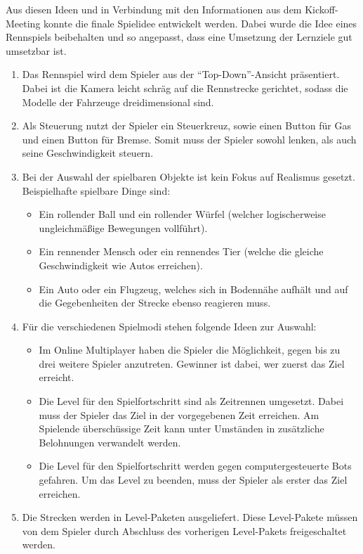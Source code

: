 	Aus diesen Ideen und in Verbindung mit den Informationen aus dem Kickoff-Meeting konnte die finale Spielidee entwickelt werden. Dabei wurde die Idee eines Rennspiels beibehalten und so angepasst, dass eine Umsetzung der Lernziele gut umsetzbar ist.
	\begin{enumerate}
		\item{Das Rennspiel wird dem Spieler aus der \enquote{Top-Down}-Ansicht präsentiert. Dabei ist die Kamera leicht schräg auf die Rennstrecke gerichtet, sodass die Modelle der Fahrzeuge dreidimensional sind.}
		\item{Als Steuerung nutzt der Spieler ein Steuerkreuz, sowie einen Button für Gas und einen Button für Bremse. Somit muss der Spieler sowohl lenken, als auch seine Geschwindigkeit steuern.}
		\item{Bei der Auswahl der spielbaren Objekte ist kein Fokus auf Realismus gesetzt. Beispielhafte spielbare Dinge sind:}
		\begin{itemize}
			\item{Ein rollender Ball und ein rollender Würfel (welcher logischerweise ungleichmäßige Bewegungen vollführt).}
			\item{Ein rennender Mensch oder ein rennendes Tier (welche die gleiche Geschwindigkeit wie Autos erreichen).}
			\item{Ein Auto oder ein Flugzeug, welches sich in Bodennähe aufhält und auf die Gegebenheiten der Strecke ebenso reagieren muss.}
		\end{itemize}
		\item{Für die verschiedenen Spielmodi stehen folgende Ideen zur Auswahl:}
		\begin{itemize}
			\item{Im Online Multiplayer haben die Spieler die Möglichkeit, gegen bis zu drei weitere Spieler anzutreten. Gewinner ist dabei, wer zuerst das Ziel erreicht.}
			\item{Die Level für den Spielfortschritt sind als Zeitrennen umgesetzt. Dabei muss der Spieler das Ziel in der vorgegebenen Zeit erreichen. Am Spielende überschüssige Zeit kann unter Umständen in zusätzliche Belohnungen verwandelt werden.}
			\item{Die Level für den Spielfortschritt werden gegen computergesteuerte Bots gefahren. Um das Level zu beenden, muss der Spieler als erster das Ziel erreichen.}
		\end{itemize}
		\item{Die Strecken werden in Level-Paketen ausgeliefert. Diese Level-Pakete müssen von dem Spieler durch Abschluss des vorherigen Level-Pakets freigeschaltet werden.}

\end{enumerate}
